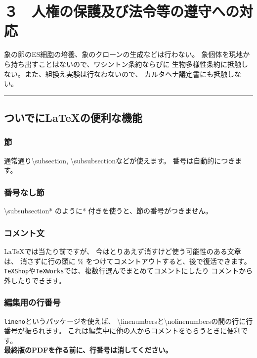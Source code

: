 \documentclass[11pt,a4j,dvipdfmx]{jarticle} 					%
\newcommand{\研究課題名}{象の卵}
\newcommand{\研究機関名}{逢坂大学}
\newcommand{\研究代表者氏名}{湯川秀樹}
\newcommand{\研究期間の最終元号年度}{12}  %
\begin{document}



\section{３　人権の保護及び法令等の遵守への対応}

	象の卵のES細胞の培養、象のクローンの生成などは行わない。
	象個体を現地から持ち出すことはないので、ワシントン条約ならびに
        生物多様性条約に抵触しない。また、組換え実験は行なわないので、
        カルタヘナ議定書にも抵触しない。

        \noindent
        \rule{\linewidth}{1pt}
        \linenumbers
        \subsection{ついでに\LaTeX の便利な機能}
        \subsubsection{節}
        通常通り\textbackslash subsection, \textbackslash subsubsectionなどが使えます。
        番号は自動的につきます。
        
        \subsubsection*{番号なし節}
        \textbackslash subsubsection* のように* 付きを使うと、節の番号がつきません。
        
        \subsubsection{コメント文}
        \LaTeX では当たり前ですが、
        今はとりあえず消すけど使う可能性のある文章は、
        消さずに行の頭に \% をつけてコメントアウトすると、後で復活できます。
        \texttt{TeXShop}や\texttt{TeXWorks}では、複数行選んでまとめてコメントにしたり
        コメントから外したりできます。
        
        \subsubsection{編集用の行番号}
        \texttt{lineno}というパッケージを使えば、
        \textbackslash linenumbersと\textbackslash nolinenumbersの間の行に行番号が振られます。
        これは編集中に他の人からコメントをもらうときに便利です。\\
        \textbf{最終版のPDFを作る前に、行番号は消してください。}
        
\end{document}
